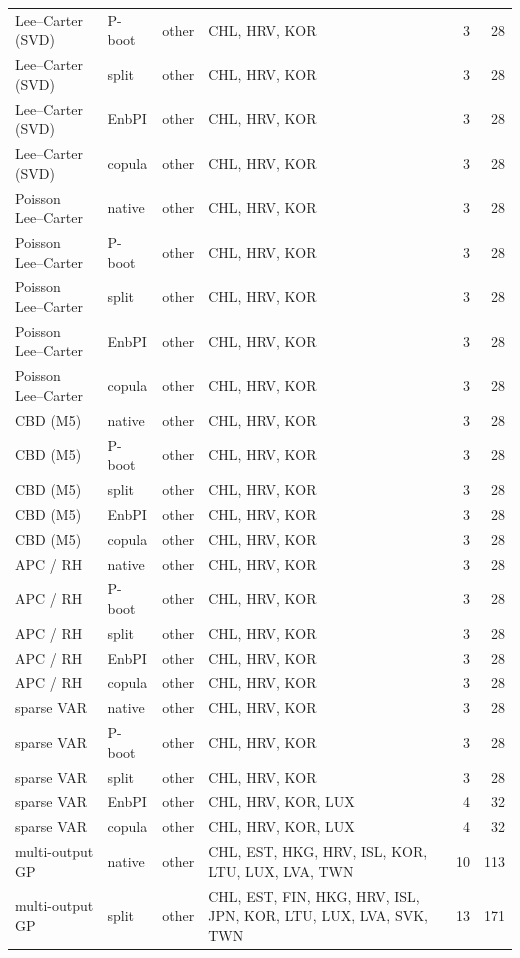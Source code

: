 {\begin{longtable}{@{}llp{1.5cm}p{5.6cm}rr@{}}
Lee--Carter (SVD) & P-boot & other & CHL, HRV, KOR & 3 & 28 \\
Lee--Carter (SVD) & split & other & CHL, HRV, KOR & 3 & 28 \\
Lee--Carter (SVD) & EnbPI & other & CHL, HRV, KOR & 3 & 28 \\
Lee--Carter (SVD) & copula & other & CHL, HRV, KOR & 3 & 28 \\
Poisson Lee--Carter & native & other & CHL, HRV, KOR & 3 & 28 \\
Poisson Lee--Carter & P-boot & other & CHL, HRV, KOR & 3 & 28 \\
Poisson Lee--Carter & split & other & CHL, HRV, KOR & 3 & 28 \\
Poisson Lee--Carter & EnbPI & other & CHL, HRV, KOR & 3 & 28 \\
Poisson Lee--Carter & copula & other & CHL, HRV, KOR & 3 & 28 \\
CBD (M5) & native & other & CHL, HRV, KOR & 3 & 28 \\
CBD (M5) & P-boot & other & CHL, HRV, KOR & 3 & 28 \\
CBD (M5) & split & other & CHL, HRV, KOR & 3 & 28 \\
CBD (M5) & EnbPI & other & CHL, HRV, KOR & 3 & 28 \\
CBD (M5) & copula & other & CHL, HRV, KOR & 3 & 28 \\
APC / RH & native & other & CHL, HRV, KOR & 3 & 28 \\
APC / RH & P-boot & other & CHL, HRV, KOR & 3 & 28 \\
APC / RH & split & other & CHL, HRV, KOR & 3 & 28 \\
APC / RH & EnbPI & other & CHL, HRV, KOR & 3 & 28 \\
APC / RH & copula & other & CHL, HRV, KOR & 3 & 28 \\
sparse VAR & native & other & CHL, HRV, KOR & 3 & 28 \\
sparse VAR & P-boot & other & CHL, HRV, KOR & 3 & 28 \\
sparse VAR & split & other & CHL, HRV, KOR & 3 & 28 \\
sparse VAR & EnbPI & other & CHL, HRV, KOR, LUX & 4 & 32 \\
sparse VAR & copula & other & CHL, HRV, KOR, LUX & 4 & 32 \\
multi-output GP & native & other & CHL, EST, HKG, HRV, ISL, KOR, LTU, LUX, LVA, TWN & 10 & 113 \\
multi-output GP & split & other & CHL, EST, FIN, HKG, HRV, ISL, JPN, KOR, LTU, LUX, LVA, SVK, TWN & 13 & 171 \\

\end{longtable}}
